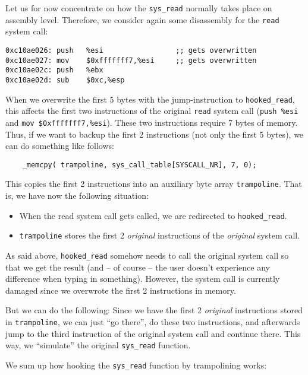 \documentclass[10pt, letterpaper]{scrartcl}
\begin{document}
Let us for now concentrate on how the \texttt{sys\_read} normally takes place on assembly level. Therefore, we consider again some disassembly for the \texttt{read} system call:

\begin{verbatim}
0xc10ae026:	push   %esi                 ;; gets overwritten
0xc10ae027:	mov    $0xfffffff7,%esi     ;; gets overwritten
0xc10ae02c:	push   %ebx
0xc10ae02d:	sub    $0xc,%esp
\end{verbatim}

When we overwrite the first 5 bytes with the jump-instruction to \texttt{hooked\_read}, this affects the first two instructions of the original \texttt{read} system call (\texttt{push \%esi} and \texttt{mov \$0xfffffff7,\%esi}). These two instructions require 7 bytes of memory. Thus, if we want to backup the first 2 instructions (not only the first 5 bytes), we can do something like follows:

\begin{verbatim}
    _memcpy( trampoline, sys_call_table[SYSCALL_NR], 7, 0);
\end{verbatim}

This copies the first 2 instructions into an auxiliary byte array \texttt{trampoline}. That is, we have now the following situation:

\begin{itemize}
\item When the read system call gets called, we are redirected to \texttt{hooked\_read}.
\item \texttt{trampoline} stores the first 2 \emph{original} instructions of the \emph{original} system call.
\end{itemize}

As said above, \texttt{hooked\_read} somehow needs to call the original system call so that we get the result (and -- of course -- the user doesn't experience any difference when typing in something). However, the system call is currently damaged since we overwrote the first 2 instructions in memory.

But we can do the following: Since we have the first 2 \emph{original} instructions stored in \texttt{trampoline}, we can just ``go there'', do these two instructions, and afterwards jump to the third instruction of the original system call and continue there. This way, we ``simulate'' the original \texttt{sys\_read} function.

We sum up how hooking the \texttt{sys\_read} function by trampolining works:
\end{document}
